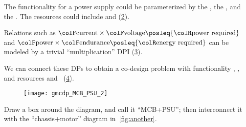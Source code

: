 \begin{example}
    \begin{figure}[h]
        \centering
        \caption{\label{fig:mcb}}
    \end{figure}


    \noindent The functionality for a power supply could be parameterized
    by the , the , and the .
    The resources could include  and  (\cref{fig:example-ba}).

    \begin{figure}[h]
        \centering
        \caption{\label{fig:example-ba}}
    \end{figure}



    Relations such as ${\colF\mbox{current}}\times{\colF\mbox{voltage}}\posleq{\colR\mbox{power required}}$
    and ${\colF\mbox{power}}\times{\colF\mbox{endurance}}\posleq{\colR\mbox{energy required}}$
    can be modeled by a trivial ``multiplication'' DPI (\cref{fig:current_times_voltage}).

    \begin{figure}[h]
        \centering
        \caption{\label{fig:current_times_voltage}}
    \end{figure}


    We can connect these DPs to obtain a co-design problem with
    functionality , ,  and resources
     and ~(\cref{fig:connect}).

    \begin{figure}[h]
        \centering
        \texttt{[image: gmcdp\_MCB\_PSU\_2]}
        \caption{\label{fig:connect}}
    \end{figure}


    Draw a box around the diagram, and call it ``MCB+PSU'';
    then interconnect it with the ``chassis+motor'' diagram in~\cref{fig:another}.



\end{example}
